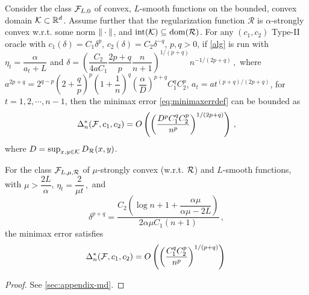 \begin{theorem}
\label{thm:ub}
Consider the class $\mathcal{F}_{L,0}$ of convex, $L$-smooth functions on the bounded, convex domain $\mathcal{K} \subset \mathbb{R}^d$.
Assume further that the regularization function $\mathcal{R}$ is $\alpha$-strongly convex w.r.t. some norm $\|\cdot\|$, and $\operatorname{int}(\mathcal{K})\subseteq \operatorname{dom}(\mathcal{R})$.
For any $(c_1,c_2)$ Type-II oracle 
 with $c_1(\delta) = C_1 \delta^p$, $c_2(\delta) = C_2 \delta^{-q}$, $p,q>0$, 
 if \cref{alg} is run with $\eta_t = \dfrac{\alpha}{a_t+L}$ and
 $
 \delta = \left( \dfrac{C_2}{4aC_1}\dfrac{2p+q}{p}\dfrac{n}{n+1}\right)^{1/(p+q)}n^{-1/(2p+q)} \,,$  where
 $a^{2p+q} =2^{q-p}\left( 2+\dfrac{q}{p} \right)^p\left(1+ \dfrac{1}{n} \right)^q \left( \dfrac{\alpha}{D} \right)^{p+q}C_1^q C_2^p $,
 $a_t = a t^{(p+q)/(2p+q)}$, for $t=1, 2, \cdots, n-1$,
then  the minimax error \eqref{eq:minimaxerrdef} can be bounded as
 \begin{align*}
 \Delta_n^*(\mathcal{F},c_1,c_2)= O\left(\left(\dfrac{D^pC_1^qC_2^p}{n^p}\right)^{1/(2p+q)}\right)\,,
 \end{align*}
 where $D=\sup_{x,y\in \mathcal{K}} D_{\mathcal{R}}(x,y)$.
 
For the class $\mathcal{F}_{L,\mu,\mathcal{R}}$ of $\mu$-strongly convex (w.r.t. $\mathcal{R}$) and $L$-smooth functions, with $\mu > \dfrac{2L}{\alpha}$, 
$
 \eta_t = \dfrac{2}{\mu t} \,,
$ and
\[
\delta^{p+q} =  \dfrac{C_2\left( \log n+1+\dfrac{\alpha \mu}{\alpha \mu -2L}\right)}{2\alpha \mu C_1 (n+1)} \,,
\]
the minimax error satisfies 
 \begin{align*}
\Delta_n^*(\mathcal{F},c_1,c_2)= O\left( \left(\dfrac{C_1^q C_2^p}{n^p} \right)^{1/(p+q)} \right)\,
 \end{align*}
\end{theorem}
\begin{proof}
See \cref{sec:appendix-md}.
\end{proof}

